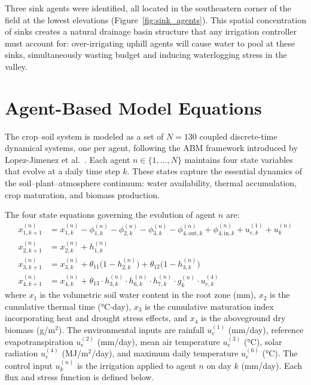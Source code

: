 Three sink agents were identified, all located in the southeastern corner of the field at the lowest elevations (Figure~\ref{fig:sink_agents}). This spatial concentration of sinks creates a natural drainage basin structure that any irrigation controller must account for: over-irrigating uphill agents will cause water to pool at these sinks, simultaneously wasting budget and inducing waterlogging stress in the valley.


\section{Agent-Based Model Equations}
\label{sec:abm_equations}

The crop--soil system is modeled as a set of $N = 130$ coupled discrete-time dynamical systems, one per agent, following the ABM framework introduced by Lopez-Jimenez et al.~\cite{Lopezjimenez2024}. Each agent $n \in \{1, \ldots, N\}$ maintains four state variables that evolve at a daily time step $k$. These states capture the essential dynamics of the soil--plant--atmosphere continuum: water availability, thermal accumulation, crop maturation, and biomass production.

The four state equations governing the evolution of agent $n$ are:
\begin{align}
    x_{1,k+1}^{(n)} &= x_{1,k}^{(n)} - \phi_{1,k}^{(n)} - \phi_{2,k}^{(n)} - \phi_{3,k}^{(n)} - \phi_{4,\text{out},k}^{(n)} + \phi_{4,\text{in},k}^{(n)} + u_{e,k}^{(1)} + u_k^{(n)} \label{eq:x1} \\
    x_{2,k+1}^{(n)} &= x_{2,k}^{(n)} + h_{1,k}^{(n)} \label{eq:x2} \\
    x_{3,k+1}^{(n)} &= x_{3,k}^{(n)} + \theta_{11}\bigl(1 - h_{2,k}^{(n)}\bigr) + \theta_{12}\bigl(1 - h_{3,k}^{(n)}\bigr) \label{eq:x3} \\
    x_{4,k+1}^{(n)} &= x_{4,k}^{(n)} + \theta_{13} \cdot h_{3,k}^{(n)} \cdot h_{6,k}^{(n)} \cdot h_{7,k}^{(n)} \cdot g_k^{(n)} \cdot u_{e,k}^{(4)} \label{eq:x4}
\end{align}
where $x_1$ is the volumetric soil water content in the root zone (mm), $x_2$ is the cumulative thermal time (°C$\cdot$day), $x_3$ is the cumulative maturation index incorporating heat and drought stress effects, and $x_4$ is the aboveground dry biomass (g/m$^2$). The environmental inputs are rainfall $u_e^{(1)}$ (mm/day), reference evapotranspiration $u_e^{(2)}$ (mm/day), mean air temperature $u_e^{(3)}$ (°C), solar radiation $u_e^{(4)}$ (MJ/m$^2$/day), and maximum daily temperature $u_e^{(6)}$ (°C). The control input $u^{(n)}_k$ is the irrigation applied to agent $n$ on day $k$ (mm/day). Each flux and stress function is defined below.

